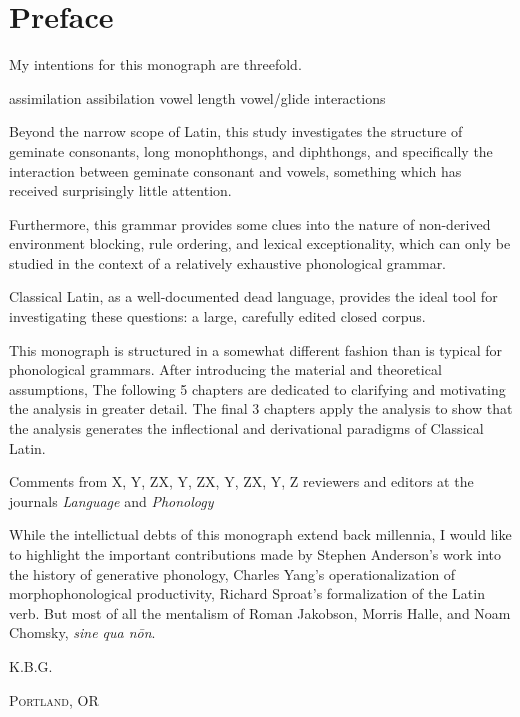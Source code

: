 \chapter*{Preface}

My intentions for this monograph are threefold.

assimilation
assibilation
vowel length
vowel/glide interactions

Beyond the narrow scope of Latin, this study investigates the structure of geminate consonants, long monophthongs, and diphthongs, and specifically the interaction between geminate consonant and vowels, something which has received surprisingly little attention.

Furthermore, this grammar provides some clues into the nature of non-derived environment blocking, rule ordering, and lexical exceptionality, which can only be studied in the context of a relatively exhaustive phonological grammar.

Classical Latin, as a well-documented dead language, provides the ideal tool for investigating these questions: a large, carefully edited closed corpus.

This monograph is structured in a somewhat different fashion than is typical for phonological grammars.
After introducing the material and theoretical assumptions,
The following 5 chapters are dedicated to clarifying and motivating the analysis in greater detail.
The final 3 chapters apply the analysis to show that the analysis generates the inflectional and derivational paradigms of Classical Latin.

Comments from X, Y, ZX, Y, ZX, Y, ZX, Y, Z
reviewers and editors at the journals \emph{Language} and \emph{Phonology}

While the intellictual debts of this monograph extend back millennia, I would like to highlight the important contributions made by Stephen Anderson's work into the history of generative phonology, Charles Yang's operationalization of morphophonological productivity, Richard Sproat's formalization of the Latin verb. But most of all the mentalism of Roman Jakobson, Morris Halle, and Noam Chomsky, \emph{sine qua nōn}.

\hfill\textsc{K.B.G.}

\noindent
\textsc{Portland, OR}\\
\textsc{\monthname~\the\year}
